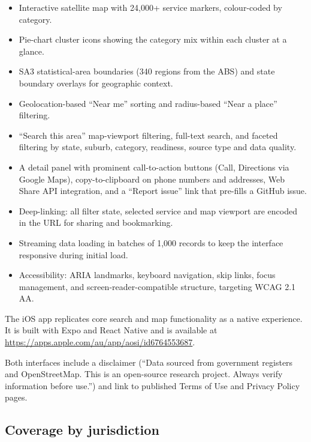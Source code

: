 \documentclass[11pt,a4paper]{article}
\begin{document}
\begin{itemize}[nosep]
    \item Interactive satellite map with 24{,}000+ service markers, colour-coded by category.
    \item Pie-chart cluster icons showing the category mix within each cluster at a glance.
    \item SA3 statistical-area boundaries (340 regions from the ABS) and state boundary overlays for geographic context.
    \item Geolocation-based ``Near me'' sorting and radius-based ``Near a place'' filtering.
    \item ``Search this area'' map-viewport filtering, full-text search, and faceted filtering by state, suburb, category, readiness, source type and data quality.
    \item A detail panel with prominent call-to-action buttons (Call, Directions via Google Maps), copy-to-clipboard on phone numbers and addresses, Web Share API integration, and a ``Report issue'' link that pre-fills a GitHub issue.
    \item Deep-linking: all filter state, selected service and map viewport are encoded in the URL for sharing and bookmarking.
    \item Streaming data loading in batches of 1{,}000 records to keep the interface responsive during initial load.
    \item Accessibility: ARIA landmarks, keyboard navigation, skip links, focus management, and screen-reader-compatible structure, targeting WCAG 2.1 AA.
\end{itemize}

The iOS app replicates core search and map functionality as a native experience. It is built with Expo and React Native and is available at \url{https://apps.apple.com/au/app/aosi/id6764553687}.

Both interfaces include a disclaimer (``Data sourced from government registers and OpenStreetMap. This is an open-source research project. Always verify information before use.'') and link to published Terms of Use and Privacy Policy pages.

\subsection{Coverage by jurisdiction}
\end{document}
